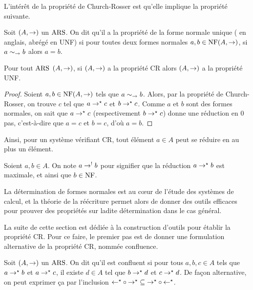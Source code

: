 L'intérêt de la propriété de Church-Rosser est qu'elle implique la propriété
suivante.

\begin{definition}
  Soit $(A,\mathrel{\to})$ un $\operatorname{ARS}$. On dit qu'il a la propriété de la forme normale
  unique ( en anglais, abrégé en UNF)
  si pour toutes deux formes normales $a,b \in \operatorname{NF}(A,\mathrel{\to})$, si
  $a \sim_{\mathord{\mathrel{\to}}} b$ alors $a = b$.
\end{definition}

\begin{proposition}
  Pour tout $\operatorname{ARS}$ $(A,\mathrel{\to})$, si $(A,\mathrel{\to})$ a la propriété CR alors
  $(A,\mathrel{\to})$ a la propriété UNF.
\end{proposition}

\begin{proof}
  Soient $a,b\in \operatorname{NF}(A,\mathrel{\to})$ tels que $a \sim_{\mathord{\mathrel{\to}}} b$. Alors, par la
  propriété de Church-Rosser, on trouve $c$ tel que $a \mathrel{\to}^{\mathord{\star}} c$ et
  $b\mathrel{\to}^{\mathord{\star}} c$. Comme $a$ et $b$ sont des formes normales, on sait que
  $a \mathrel{\to}^{\mathord{\star}} c$ (respectivement $b\mathrel{\to}^{\mathord{\star}} c$) donne une réduction en $0$
  pas, c'est-à-dire que $a = c$ et $b = c$, d'où $a = b$.
\end{proof}

Ainsi, pour un système vérifiant CR, tout élément $a \in A$ peut se réduire en
au plus un élément.

\begin{notation}
  Soient $a,b \in A$. On note $a\mathrel{\to}^{\mathord{!}} b$ pour signifier que la réduction
  $a \mathrel{\to}^{\mathord{\star}} b$ est maximale, et ainsi que $b \in \operatorname{NF}$.
\end{notation}

La détermination de formes normales est au c\oe ur de l'étude des systèmes de
calcul, et la théorie de la réécriture permet alors de donner des outils
efficaces pour prouver des propriétés sur ladite détermination dans le cas
général.

La suite de cette section est dédiée à la construction d'outils pour établir
la propriété CR. Pour ce faire, le premier pas est de donner une formulation
alternative de la propriété CR, nommée confluence.

\begin{definition}[Confluence]
  Soit $(A,\mathrel{\to})$ un $\operatorname{ARS}$. On dit qu'il est confluent si pour tous
  $a,b,c \in A$ tels que $a \mathrel{\to}^{\mathord{\star}} b$ et $a \mathrel{\to}^{\mathord{\star}} c$, il existe
  $d \in A$ tel que $b \mathrel{\to}^{\mathord{\star}} d$ et $c\mathrel{\to}^{\mathord{\star}} d$. De façon alternative,
  on peut exprimer ça par l'inclusion
  $\mathord{\mathrel{\leftarrow}^{\mathord{\star}}}\circ\mathord{\mathrel{\to}^{\mathord{\star}}}\subseteq
  \mathord{\mathrel{\to}^{\mathord{\star}}}\circ\mathord{\mathrel{\leftarrow}^{\mathord{\star}}}$.
\end{definition}

